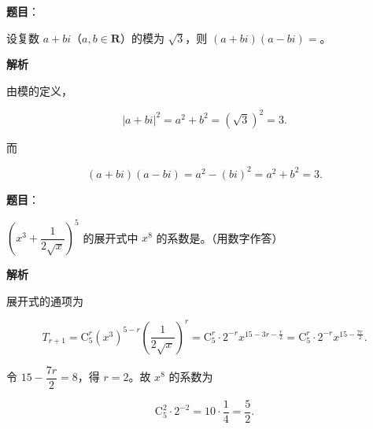 \begin{answer}

\textbf{题目}：

设复数 $a+bi$（$a,b\in\mathbf{R}$）的模为 $\sqrt{3}$，则 $(a+bi)(a-bi)=$\gkblank{}。

\textbf{解析}

由模的定义，

\nopagebreak[4]
\[
|a+bi|^{2}=a^{2}+b^{2}=(\sqrt{3})^{2}=3.
\]

而

\nopagebreak[4]
\[
(a+bi)(a-bi)=a^{2}-(bi)^{2}=a^{2}+b^{2}=3.
\]


\end{answer}
\begin{answer}

\textbf{题目}：

$\left(x^{3}+\dfrac{1}{2\sqrt{x}}\right)^{5}$ 的展开式中 $x^{8}$ 的系数是\gkblank{}。（用数字作答）

\textbf{解析}

展开式的通项为

\nopagebreak[4]
\[
T_{r+1}=\mathrm{C}_{5}^{r}(x^{3})^{5-r}\left(\frac{1}{2\sqrt{x}}\right)^{r}
=\mathrm{C}_{5}^{r}\cdot 2^{-r}x^{15-3r-\frac{r}{2}}
=\mathrm{C}_{5}^{r}\cdot 2^{-r}x^{15-\frac{7r}{2}}.
\]

令 $15-\dfrac{7r}{2}=8$，得 $r=2$。故 $x^{8}$ 的系数为

\nopagebreak[4]
\[
\mathrm{C}_{5}^{2}\cdot 2^{-2}=10\cdot\frac{1}{4}=\frac{5}{2}.
\]


\end{answer}
